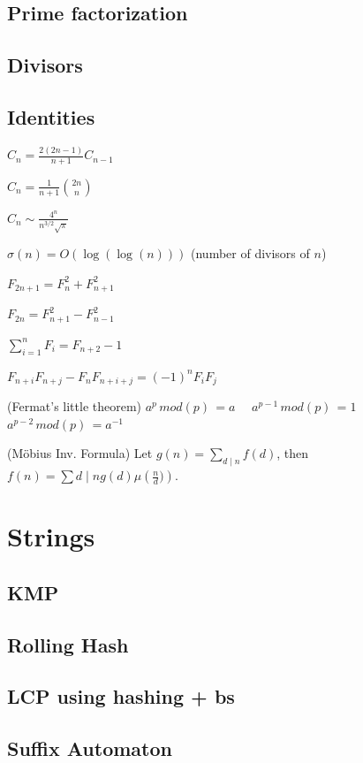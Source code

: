 \subsection{Prime factorization}
\subsection{Divisors}

\subsection{Identities}
{
	$C_n = \frac{2(2n-1)}{n+1} C_{n-1}$

	$C_n = \frac{1}{n+1} \binom{2n}{n}$

	$C_n \sim \frac{4^n}{n^{3/2}\sqrt{\pi}}$

	$\sigma(n) = O(\log(\log(n)))$ (number of divisors of $n$)

	$F_{2n+1} = F_{n}^2 + F_{n+1}^2$

	$F_{2n} = F_{n+1}^2 - F_{n-1}^2$

	$\sum_{i=1}^n F_i = F_{n+2}-1$

	$F_{n+i}F_{n+j} - F_nF_{n+i+j} = (-1)^n F_iF_j$

    (Fermat's little theorem)
    $a^{p}\,mod(p)\,= a\quad$
    $a^{p-1}\,mod(p)\,=1\quad$
    $a^{p-2}\,mod(p)\,=a^{-1}$

	(Möbius Inv. Formula)
	Let $g(n) = \sum_{d\mid n} f(d)$, then $f(n)=\sum{d\mid n} g(d) \mu\left(\frac{n}{d})\right)$.
}

\section{Strings}
\subsection{KMP}
\subsection{Rolling Hash}
\subsection{LCP using hashing + bs}
\subsection{Suffix Automaton}
